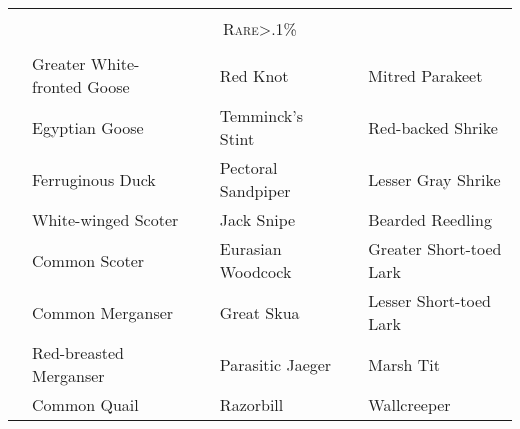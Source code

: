 \documentclass{article}
\begin{document}
\begin{center}
 
\begin{tabularx}{\textwidth}{cXcXcX} 
\hline
\\
\multicolumn{6}{c}{\textsc{ \Large{Rare\footnotesize{>.1\%}}}} \\ 
\\
\hline
\underline{\hspace{3ex}} 	 &Greater White-fronted Goose 	 &\underline{\hspace{3ex}} 	 &Red Knot 	 &\underline{\hspace{3ex}} 	 &Mitred Parakeet \\ 
\underline{\hspace{3ex}} 	 &Egyptian Goose 	 &\underline{\hspace{3ex}} 	 &Temminck's Stint 	 &\underline{\hspace{3ex}} 	 &Red-backed Shrike \\ 
\underline{\hspace{3ex}} 	 &Ferruginous Duck 	 &\underline{\hspace{3ex}} 	 &Pectoral Sandpiper 	 &\underline{\hspace{3ex}} 	 &Lesser Gray Shrike \\ 
\underline{\hspace{3ex}} 	 &White-winged Scoter 	 &\underline{\hspace{3ex}} 	 &Jack Snipe 	 &\underline{\hspace{3ex}} 	 &Bearded Reedling \\ 
\underline{\hspace{3ex}} 	 &Common Scoter 	 &\underline{\hspace{3ex}} 	 &Eurasian Woodcock 	 &\underline{\hspace{3ex}} 	 &Greater Short-toed Lark \\ 
\underline{\hspace{3ex}} 	 &Common Merganser 	 &\underline{\hspace{3ex}} 	 &Great Skua 	 &\underline{\hspace{3ex}} 	 &Lesser Short-toed Lark \\ 
\underline{\hspace{3ex}} 	 &Red-breasted Merganser 	 &\underline{\hspace{3ex}} 	 &Parasitic Jaeger 	 &\underline{\hspace{3ex}} 	 &Marsh Tit \\ 
\underline{\hspace{3ex}} 	 &Common Quail 	 &\underline{\hspace{3ex}} 	 &Razorbill 	 &\underline{\hspace{3ex}} 	 &Wallcreeper \\ 

\end{tabularx}
\end{center}
\end{document}
